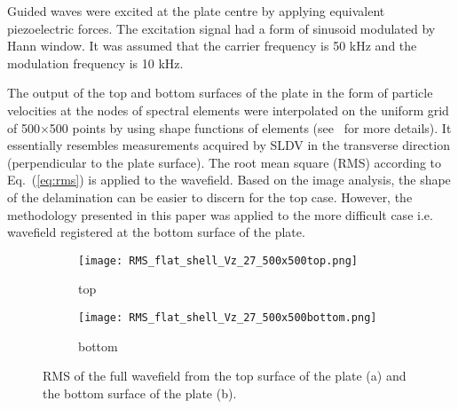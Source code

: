 Guided waves were excited at the plate centre by applying equivalent piezoelectric forces.
The excitation signal had a form of sinusoid modulated by Hann window. 
It was assumed that the carrier frequency is 50 kHz and the modulation frequency is 10 kHz.

The output of the top and bottom surfaces of the plate in the form of particle velocities at the nodes of spectral elements were interpolated on the uniform grid of 500\(\times\)500 points by using shape functions of elements (see~\cite{Kudela2020} for more details).
It essentially resembles measurements acquired by SLDV in the transverse direction (perpendicular to the plate surface). 
The root mean square (RMS) according to Eq.~(\ref{eq:rms}) is applied to the wavefield.
Based on the image analysis, the shape of the delamination can be easier to discern for the top case.
However, the methodology presented in this paper was applied to the more difficult case i.e. wavefield registered at the bottom surface of the plate.
\begin{figure} [h!]
	\centering
	\begin{subfigure}[b]{0.47\textwidth}
		\centering
		\texttt{[image: RMS\_flat\_shell\_Vz\_27\_500x500top.png]}
		\caption{top}
		\label{fig:rmstop}
	\end{subfigure}
	\hfill
	\begin{subfigure}[b]{0.47\textwidth}
		\centering
		\texttt{[image: RMS\_flat\_shell\_Vz\_27\_500x500bottom.png]}
		\caption{bottom}
		\label{fig:rmsbottom}
	\end{subfigure}
	\caption{RMS of the full wavefield from the top surface of the plate (a) and the bottom surface of the plate (b).}
\label{fig:rms}
\end{figure} 